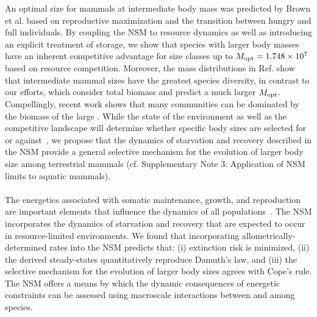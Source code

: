 \documentclass[twocolumn,preprintnumbers,amsmath,amssymb,superscriptaddress]{revtex4}
\begin{document}
An optimal size for mammals at intermediate body mass was predicted by Brown et al. \citep{Brown:1993p708} based on reproductive maximization and the transition between hungry and full individuals. 
By coupling the NSM to resource dynamics as well as introducing an explicit treatment of storage, we show that species with larger body masses have an inherent competitive advantage for size classes up to $M_{\rm \rm opt}= 1.748\times10^7$ based on resource competition. Moreover, the mass distributions in Ref. \citep{Brown:1993p708} show that intermediate mammal sizes have the greatest species diversity, in contrast to our efforts, which consider total biomass and predict a much larger $M_{\rm \rm opt}$.
Compellingly, recent work shows that many communities can be dominated by the biomass of the large \citep{Hempson:2015hka}.
While the state of the environment as well as the competitive landscape will determine whether specific body sizes are selected for or against~\citep{Saarinen:2014br}, we propose that the dynamics of starvation and recovery described in the NSM provide a general selective mechanism for the evolution of larger body size among terrestrial mammals (cf. Supplementary Note 3: Application of NSM limits to aquatic mammals).\\



 \\

The energetics associated with somatic maintenance, growth, and reproduction
are important elements that influence the dynamics of all
populations~\citep{Stearns:1989ip}.  The NSM incorporates the dynamics of
starvation and recovery that are expected to occur in resource-limited
environments.  We found that incorporating allometrically-determined rates
into the NSM predicts that: (i) extinction risk is minimized, (ii) the
derived steady-states quantitatively reproduce Damuth's law, and (iii) the
selective mechanism for the evolution of larger body sizes agrees with Cope's
rule.  The NSM offers a means by which the dynamic consequences of energetic
constraints can be assessed using macroscale interactions between and among
species.\\
\end{document}
